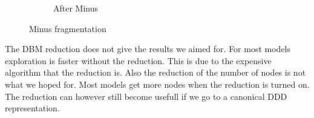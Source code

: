 \begin{figure}[h]
\begin{subfigure}[b]{\textwidth}
\centering
\begin{adjustbox}{max totalheight=.3\textheight}
\end{adjustbox}
\caption{After Minus}
\label{fig:after_minus_zone}
\end{subfigure}

\caption{Minus fragmentation}
\label{fig:fragmentation}
\end{figure}

The DBM reduction does not give the results we aimed for. For most models exploration is faster without the reduction. This is due to the expensive algorithm that the reduction is. Also the reduction of the number of nodes is not what we hoped for. Most models get more nodes when the reduction is turned on. The reduction can however still become usefull if we go to a canonical DDD representation. 

